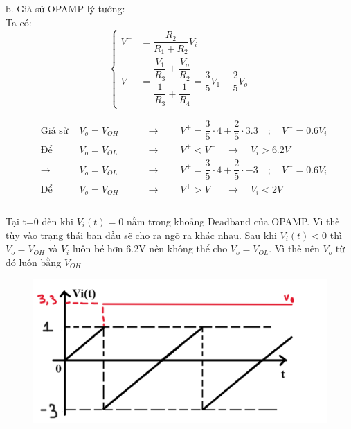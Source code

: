 b. Giả sử OPAMP lý tưởng:\\
Ta có:
\[
\left\{
\begin{aligned}
V^- &= \dfrac{R_2}{R_1+R_2}V_i \\
V^+ &= \dfrac{\dfrac{V_1}{R_3} + \dfrac{V_o}{R_2}}{\dfrac{1}{R_3} + \dfrac{1}{R_4}} = \dfrac{3}{5}V_1 +\dfrac{2}{5}V_o
\end{aligned}
\right.
\]

\[
\begin{aligned}
&\text{Giả sử }& V_o = V_{OH} &\qquad\rightarrow\qquad V^+ = \dfrac{3}{5}\cdot4 + \dfrac{2}{5}\cdot3.3 \quad;\quad V^- = 0.6V_i \\
&\text{Để }& V_o = V_{OL} &\qquad\rightarrow\qquad V^+ < V^- \quad\rightarrow\quad \boxed{V_i>6.2V}\\
&\rightarrow& V_o = V_{OL} &\qquad\rightarrow\qquad V^+ = \dfrac{3}{5}\cdot4 + \dfrac{2}{5}\cdot-3 \quad;\quad V^- = 0.6V_i \\
&\text{Để }& V_o = V_{OH} &\qquad\rightarrow\qquad V^+ > V^- \quad\rightarrow\quad \boxed{V_i<2V}\\
\end{aligned}
\]\\
Tại t=0 đến khi $V_i(t)=0$ nằm trong khoảng Deadband của OPAMP. Vì thế tùy vào trạng thái ban đầu sẽ cho ra ngõ ra khác nhau.
Sau khi $V_i(t)<0$ thì $V_o = V_{OH}$ và $V_i$ luôn bé hơn 6.2V nên không thể cho $V_o=V_{OL}$. Vì thế nên $V_o$ từ đó luôn bằng $V_{OH}$
\begin{figure}[H]
	\centering
	\includegraphics[scale=1]{image/C13_b_BT.png}
\end{figure}

